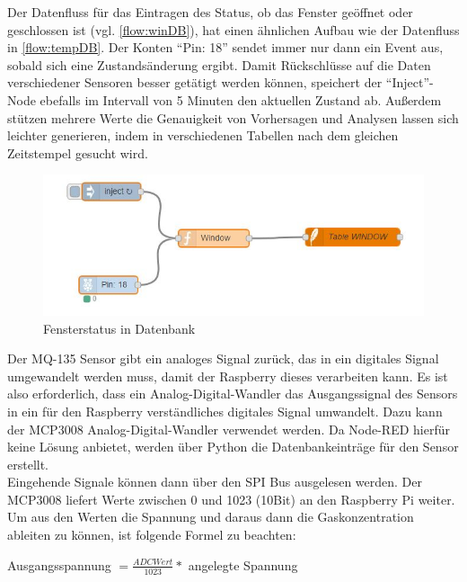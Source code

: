 Der Datenfluss für das Eintragen des Status, ob das Fenster geöffnet oder geschlossen ist (vgl. \autoref{flow:winDB}), hat einen ähnlichen Aufbau wie der Datenfluss in \autoref{flow:tempDB}. Der Konten \enquote{Pin: 18} sendet immer nur dann ein Event aus, sobald sich eine Zustandsänderung ergibt. Damit Rückschlüsse auf die Daten verschiedener Sensoren besser getätigt werden können, speichert der \enquote{Inject}-Node ebefalls im Intervall von 5 Minuten den aktuellen Zustand ab. 
Außerdem stützen mehrere Werte die Genauigkeit von Vorhersagen und Analysen lassen sich leichter generieren, indem in verschiedenen Tabellen nach dem gleichen Zeitstempel gesucht wird.
\begin{figure}[h]
	\centering
	\includegraphics[scale=0.7]{images/windowIntoDB}
	\caption{Fensterstatus in Datenbank}
	\label{flow:winDB}
\end{figure}

Der MQ-135 Sensor gibt ein analoges Signal zurück, das in ein digitales Signal umgewandelt werden muss, damit der Raspberry dieses verarbeiten kann. Es ist also erforderlich, dass ein Analog-Digital-Wandler das Ausgangssignal des Sensors in ein für den Raspberry verständliches digitales Signal umwandelt. Dazu kann der MCP3008 Analog-Digital-Wandler verwendet werden. Da Node-RED hierfür keine Lösung anbietet, werden über Python die Datenbankeinträge für den Sensor erstellt.
\\Eingehende Signale können dann über den \acf{SPI} Bus ausgelesen werden. Der MCP3008 liefert Werte zwischen 0 und 1023 (10Bit) an den Raspberry Pi weiter. Um aus den Werten die Spannung und daraus dann die Gaskonzentration ableiten zu können, ist folgende Formel zu beachten\cite{gas:MQX}:\\
\begin{center} Ausgangsspannung $=  \frac{ADC Wert}{1023} *  $ angelegte Spannung\end{center}

